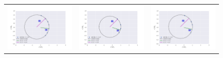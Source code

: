 \begin{figure}
\begin{tabular}{@{}c@{}c@{}c@{}}
\includegraphics[clip]{./Figures/LV-bowshocks-xyfancy-positionswill-168-328} &  \includegraphics[clip]{./Figures/LV-bowshocks-xyfancy-positionssamp00-168-328} & \includegraphics[clip]{./Figures/LV-bowshocks-xyfancy-positionssamp01-168-328}

\end{tabular}
\end{figure}
